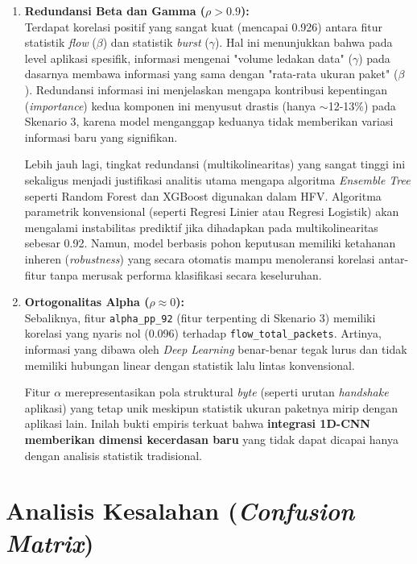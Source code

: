 \begin{enumerate}
    \item \textbf{Redundansi Beta dan Gamma ($\rho > 0.9$):} \\
    Terdapat korelasi positif yang sangat kuat (mencapai 0.926) antara fitur statistik \textit{flow} ($\beta$) dan statistik \textit{burst} ($\gamma$). Hal ini menunjukkan bahwa pada level aplikasi spesifik, informasi mengenai "volume ledakan data" ($\gamma$) pada dasarnya membawa informasi yang sama dengan "rata-rata ukuran paket" ($\beta$). Redundansi informasi ini menjelaskan mengapa kontribusi kepentingan (\textit{importance}) kedua komponen ini menyusut drastis (hanya $\sim$12-13\%) pada Skenario 3, karena model menganggap keduanya tidak memberikan variasi informasi baru yang signifikan.
    
    Lebih jauh lagi, tingkat redundansi (multikolinearitas) yang sangat tinggi ini sekaligus menjadi justifikasi analitis utama mengapa algoritma \textit{Ensemble Tree} seperti Random Forest dan XGBoost digunakan dalam HFV. Algoritma parametrik konvensional (seperti Regresi Linier atau Regresi Logistik) akan mengalami instabilitas prediktif jika dihadapkan pada multikolinearitas sebesar 0.92. Namun, model berbasis pohon keputusan memiliki ketahanan inheren (\textit{robustness}) yang secara otomatis mampu menoleransi korelasi antar-fitur tanpa merusak performa klasifikasi secara keseluruhan.

    \item \textbf{Ortogonalitas Alpha ($\rho \approx 0$):} \\
    Sebaliknya, fitur \texttt{alpha\_pp\_92} (fitur terpenting di Skenario 3) memiliki korelasi yang nyaris nol (0.096) terhadap \texttt{flow\_total\_packets}. Artinya, informasi yang dibawa oleh \textit{Deep Learning} benar-benar tegak lurus dan tidak memiliki hubungan linear dengan statistik lalu lintas konvensional. 
    
    Fitur $\alpha$ merepresentasikan pola struktural \textit{byte} (seperti urutan \textit{handshake} aplikasi) yang tetap unik meskipun statistik ukuran paketnya mirip dengan aplikasi lain. Inilah bukti empiris terkuat bahwa \textbf{integrasi 1D-CNN memberikan dimensi kecerdasan baru} yang tidak dapat dicapai hanya dengan analisis statistik tradisional.
\end{enumerate}

\section{Analisis Kesalahan (\textit{Confusion Matrix})}
\label{sec:analisis_kesalahan}

